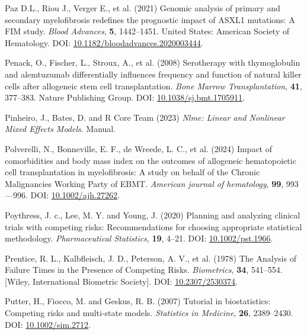 \documentclass[
  letterpaper,
  DIV=11,
  numbers=noendperiod]{scrreprt}
\newlength{\cslhangindent}
\newlength{\cslentryspacingunit} %
\newenvironment{CSLReferences}[2] %
 {%
  \setlength{\parindent}{0pt}
  \ifodd #1
  \let\oldpar\par
  \def\par{\hangindent=\cslhangindent\oldpar}
  \fi
  \setlength{\parskip}{#2\cslentryspacingunit}
 }%
 {}
\begin{document}
\begin{CSLReferences}{1}{0}
\leavevmode{}%
Paz D.L., Riou J., Verger E., et al. (2021) Genomic analysis of primary
and secondary myelofibrosis redefines the prognostic impact of {ASXL1}
mutations: {A FIM} study. \emph{Blood Advances}, \textbf{5}, 1442--1451.
United States: American Society of Hematology. DOI:
\href{https://doi.org/10.1182/bloodadvances.2020003444}{10.1182/bloodadvances.2020003444}.

\leavevmode{}%
Penack, O., Fischer, L., Stroux, A., et al. (2008) Serotherapy with
thymoglobulin and alemtuzumab differentially influences frequency and
function of natural killer cells after allogeneic stem cell
transplantation. \emph{Bone Marrow Transplantation}, \textbf{41},
377--383. Nature Publishing Group. DOI:
\href{https://doi.org/10.1038/sj.bmt.1705911}{10.1038/sj.bmt.1705911}.

\leavevmode{}%
Pinheiro, J., Bates, D. and R Core Team (2023) \emph{Nlme: {Linear} and
Nonlinear Mixed Effects Models}. Manual.

\leavevmode{}%
Polverelli, N., Bonneville, E. F., de Wreede, L. C., et al. (2024)
Impact of comorbidities and body mass index on the outcomes of
allogeneic hematopoietic cell transplantation in myelofibrosis: {A}
study on behalf of the {Chronic Malignancies Working Party} of {EBMT}.
\emph{American journal of hematology}, \textbf{99}, 993---996. DOI:
\href{https://doi.org/10.1002/ajh.27262}{10.1002/ajh.27262}.

\leavevmode{}%
Poythress, J. c., Lee, M. Y. and Young, J. (2020) Planning and analyzing
clinical trials with competing risks: {Recommendations} for choosing
appropriate statistical methodology. \emph{Pharmaceutical Statistics},
\textbf{19}, 4--21. DOI:
\href{https://doi.org/10.1002/pst.1966}{10.1002/pst.1966}.

\leavevmode{}%
Prentice, R. L., Kalbfleisch, J. D., Peterson, A. V., et al. (1978) The
{Analysis} of {Failure Times} in the {Presence} of {Competing Risks}.
\emph{Biometrics}, \textbf{34}, 541--554. {[}Wiley, International
Biometric Society{]}. DOI:
\href{https://doi.org/10.2307/2530374}{10.2307/2530374}.

\leavevmode{}%
Putter, H., Fiocco, M. and Geskus, R. B. (2007) Tutorial in
biostatistics: Competing risks and multi-state models. \emph{Statistics
in Medicine}, \textbf{26}, 2389--2430. DOI:
\href{https://doi.org/10.1002/sim.2712}{10.1002/sim.2712}.


\end{CSLReferences}
\end{document}
